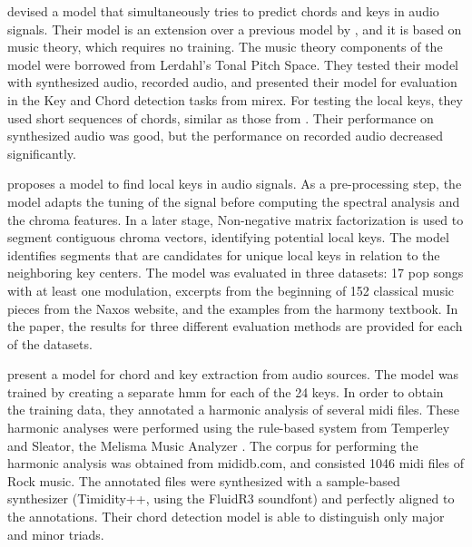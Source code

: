 \textcite{catteau2007probabilistic} devised a model that
simultaneously tries to predict chords and keys in audio
signals. Their model is an extension over a previous model
by \textcite{bello2005robust}, and it is based on music
theory, which requires no training. The music theory
components of the model were borrowed from Lerdahl's Tonal
Pitch Space. They tested their model with synthesized audio,
recorded audio, and presented their model for evaluation in
the Key and Chord detection tasks from \gls{mirex}. For
testing the local keys, they used short sequences of chords,
similar as those from \textcite{krumhansl1982tracing}. Their
performance on synthesized audio was good, but the
performance on recorded audio decreased significantly.



\textcite{izmirli2007localized} proposes a model to find
local keys in audio signals. As a pre-processing step, the
model adapts the tuning of the signal before computing the
spectral analysis and the chroma features. In a later stage,
Non-negative matrix factorization is used to segment
contiguous chroma vectors, identifying potential local keys.
The model identifies segments that are candidates for unique
local keys in relation to the neighboring key centers. The
model was evaluated in three datasets: 17 pop songs with at
least one modulation, excerpts from the beginning of 152
classical music pieces from the Naxos website, and the
examples from the \textcite{kostka1984tonal} harmony
textbook. In the paper, the results for three different
evaluation methods are provided for each of the datasets.

\textcite{lee2007unified} present a model for chord and key
extraction from audio sources. The model was trained by
creating a separate \gls{hmm} for each of the 24 keys. In
order to obtain the training data, they annotated a harmonic
analysis of several \gls{midi} files. These harmonic
analyses were performed using the rule-based system from
Temperley and Sleator, the Melisma Music Analyzer
\textcite{temperley2004cognition}. The corpus for performing
the harmonic analysis was obtained from mididb.com, and
consisted 1046 \gls{midi} files of Rock music. The annotated
files were synthesized with a sample-based synthesizer
(Timidity++, using the FluidR3 soundfont) and perfectly
aligned to the annotations. Their chord detection model is
able to distinguish only major and minor triads.


